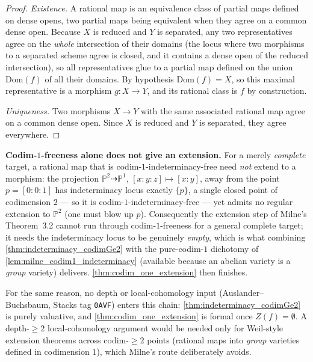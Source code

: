\begin{proof}
  \leanok
  \emph{Existence.} A rational map is an equivalence class of partial maps defined on
  dense opens, two partial maps being equivalent when they agree on a common dense
  open. Because \(X\) is reduced and \(Y\) is separated, any two representatives agree
  on the \emph{whole} intersection of their domains (the locus where two morphisms to
  a separated scheme agree is closed, and it contains a dense open of the reduced
  intersection), so all representatives glue to a partial map defined on the union
  \(\mathrm{Dom}(f)\) of all their domains. By hypothesis \(\mathrm{Dom}(f) = X\), so
  this maximal representative is a morphism \(g \colon X \to Y\), and its rational
  class is \(f\) by construction.

  \emph{Uniqueness.} Two morphisms \(X \to Y\) with the same associated rational map
  agree on a common dense open. Since \(X\) is reduced and \(Y\) is separated, they
  agree everywhere.
\end{proof}

\begin{remark}
  \label{rmk:codim1_no_extension_from_codim1free}
  \textbf{Codim-\(1\)-freeness alone does not give an extension.} For a merely
  \emph{complete} target, a rational map that is codim-\(1\)-indeterminacy-free need
  \emph{not} extend to a morphism: the projection
  \(\mathbb P^2 \dashrightarrow \mathbb P^1\), \([x:y:z] \mapsto [x:y]\), away from the
  point \(p = [0:0:1]\) has indeterminacy locus exactly \(\{p\}\), a single closed
  point of codimension \(2\) --- so it is codim-\(1\)-indeterminacy-free --- yet admits
  no regular extension to \(\mathbb P^2\) (one must blow up \(p\)). Consequently the
  extension step of Milne's Theorem~3.2 cannot run through
  codim-\(1\)-freeness for a general complete target; it needs the indeterminacy locus
  to be genuinely \emph{empty}, which is what combining
  \cref{thm:indeterminacy_codimGe2} with the pure-codim-\(1\) dichotomy of
  \cref{lem:milne_codim1_indeterminacy} (available because an abelian variety is a
  \emph{group} variety) delivers. \cref{thm:codim_one_extension} then finishes.

  For the same reason, no depth or local-cohomology input
  (Auslander--Buchsbaum, Stacks tag \texttt{0AVF}) enters this chain:
  \cref{thm:indeterminacy_codimGe2} is purely valuative, and
  \cref{thm:codim_one_extension} is formal once \(Z(f) = \emptyset\). A depth-\(\geq 2\)
  local-cohomology argument would be needed only for Weil-style extension theorems
  across codim-\(\geq 2\) points (rational maps into \emph{group} varieties defined in
  codimension \(1\)), which Milne's route deliberately avoids.
\end{remark}

